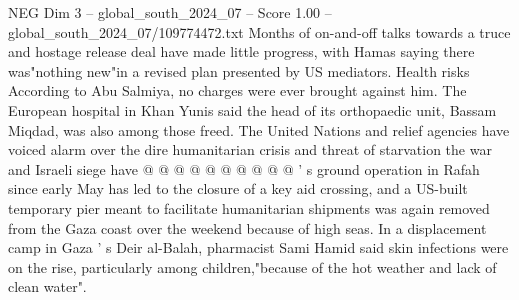 \begin{textsample}{NEG Dim 3 – global\_south\_2024\_07 – Score 1.00 – global\_south\_2024\_07/109774472.txt}
Months of on-and-off talks towards a truce and hostage release deal have made little progress, with Hamas saying there was"nothing new"in a revised plan presented by US mediators.
Health risks According to Abu Salmiya, no charges were ever brought against him.
The European hospital in Khan Yunis said the head of its orthopaedic unit, Bassam Miqdad, was also among those freed.
The United Nations and relief agencies have voiced alarm over the dire humanitarian crisis and threat of starvation the war and Israeli siege have @ @ @ @ @ @ @ @ @ @ ' s ground operation in Rafah since early May has led to the closure of a key aid crossing, and a US-built temporary pier meant to facilitate humanitarian shipments was again removed from the Gaza coast over the weekend because of high seas.
In a displacement camp in Gaza ' s Deir al-Balah, pharmacist Sami Hamid said skin infections were on the rise, particularly among children,"because of the hot weather and lack of clean water".

\end{textsample}
